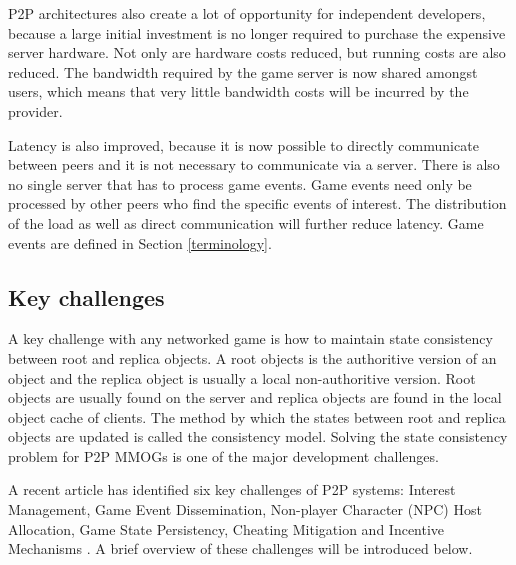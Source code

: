 \documentclass[10pt,a4paper,journal,cspaper,compsoc]{IEEEtran}
\begin{document}
P2P architectures also create a lot of opportunity for independent developers, because a large initial investment is no longer required to purchase
the expensive server hardware. Not only are hardware costs reduced, but running costs are also reduced. The bandwidth required by the game server is
now shared amongst users, which means that very little bandwidth costs will be incurred by the provider.

Latency is also improved, because it is now possible to directly communicate between peers and it is not necessary to communicate via a server. There
is also no single server that has to process game events. Game events need only be processed by other peers who find the specific events of interest.
The distribution of the load as well as direct communication will further reduce latency. Game events are defined in Section \ref{terminology}.

\subsection{Key challenges}
\label{key_challenges}

A key challenge with any networked game is how to maintain state consistency between root and replica objects. A root objects is the authoritive
version of an object and the replica object is usually a local non-authoritive version. Root objects are usually found on the server and replica
objects are found in the local object cache of clients. The method by which the states between root and replica objects are updated is called the
consistency model. Solving the state consistency problem for P2P MMOGs is one of the major development challenges.

A recent article has identified six key challenges of P2P systems: Interest Management, Game Event Dissemination, Non-player Character (NPC) Host
Allocation, Game State Persistency, Cheating Mitigation and Incentive Mechanisms \cite{Fan_deisgn_issues_p2p}. A brief overview of these challenges
will be introduced below.
\end{document}

